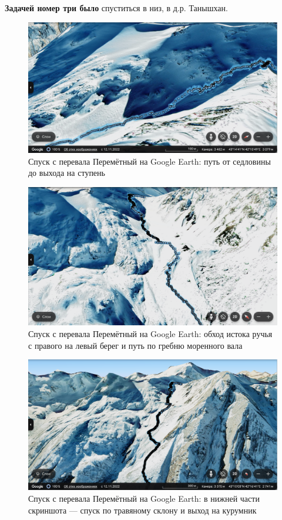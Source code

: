 \textbf{Задачей номер три было} спуститься в низ, в д.р. Танышхан. 
\begin{figure}[h!]
	\centering
	\includegraphics[width=0.7\linewidth]{../pics/google_earth/Peremetny-1.png}
	\caption{Спуск с перевала Перемётный на Google Earth: путь от седловины до выхода на ступень}
	\label{Peremetny-1}
\end{figure} 
\begin{figure}[h!]
	\centering
	\includegraphics[width=0.7\linewidth]{../pics/google_earth/Peremetny-3.png}
	\caption{Спуск с перевала Перемётный на Google Earth: обход истока ручья с правого на левый берег и путь по гребню моренного вала}
	\label{Peremetny-3}
\end{figure} 
\begin{figure}[h!]
	\centering
	\includegraphics[width=0.7\linewidth]{../pics/google_earth/Peremetny-2.png}
	\caption{Спуск с перевала Перемётный на Google Earth: в нижней части скриншота --- спуск по травяному склону и выход на курумник}
	\label{Peremetny-2}
\end{figure} 
